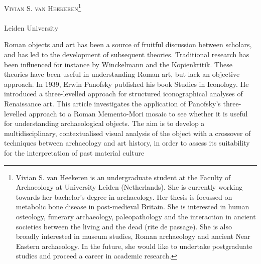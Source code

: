 \openingarticle
\def\ppages{\pagerange{heekeren:firstpage}{heekeren:lastpage}}
\def\shorttitle{A Method and an Object}
\def\maintitle{A Method and an Object: An Art Historical Approach Applied to the ‘Memento-Mori’ Mosaic from Pompeii, Italy}
\def\shortauthor{Vivian S. van Heekeren}
\def\authormail{v.s.van.heekeren@umail.leidenuniv.nl}
\def\affiliation{Leiden University}
\def\thanknote{\footnote{Vivian S. van Heekeren is an undergraduate student at the Faculty of Archaeology at University Leiden (Netherlands). She is currently working towards her bachelor’s degree in archaeology. Her thesis is focussed on metabolic bone disease in post-medieval Britain. She is interested in human osteology, funerary archaeology, paleopathology and the interaction in ancient societies between the living and the dead (rite de passage). She is also broadly interested in museum studies, Roman archaeology and ancient Near Eastern archaeology. 	In the future, she would like to undertake postgraduate studies and proceed a career in academic research.}}
\begin{center}
	{\Large\scshape\shortauthor \thanknote}\\[1em]
	\email \\
	\affiliation
\end{center}
\vspace{3em}
\midarticle
\label{heekeren:firstpage}

	\begin{myabstract}Roman objects and art has been a source of fruitful discussion between scholars, and has led to the development of subsequent theories. Traditional research has been influenced for instance by Winckelmann and the Kopienkritik. These theories have been useful in understanding Roman art, but lack an objective approach. 
In 1939, Erwin Panofsky published his book Studies in Iconology. 
He introduced a three-levelled approach for structured iconographical analyses of Renaissance art. 
This article investigates the application of Panofsky’s three-levelled approach to a Roman Memento-Mori mosaic to see whether it is useful for understanding archaeological objects. The aim is to develop a multidisciplinary, contextualised visual analysis of the object with a crossover of techniques between archaeology and art history, in order to assess its suitability for the interpretation of past material culture		
		
	\end{myabstract}
	

